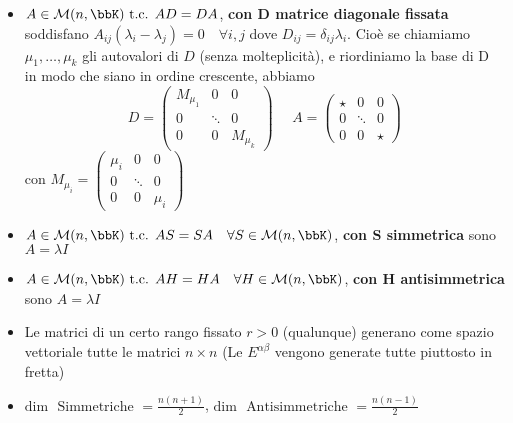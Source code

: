 \documentclass[a4paper,NoNotes]{stdmdoc}
\newcommand{\tc}{\mbox{ t.c. }}
\newcommand{\Dim}{\mbox{dim }}
\begin{document}
\begin{itemize}
		\item $A \in \mathcal{M}(n, \bbK) \tc AD = DA$, {\bf con $\bm D$ matrice diagonale fissata} soddisfano $A_{ij}(\lambda_i - \lambda_j) = 0 \quad \forall i,j$ dove $D_{ij} = \delta_{ij}\lambda_i$. Cioè se chiamiamo $\mu_1, \ldots, \mu_k$ gli autovalori di $D$ (senza molteplicità), e riordiniamo la base di D in modo che siano in ordine crescente, abbiamo $$D = \left(\begin{array}{c|c|c} M_{\mu_1} & 0 & 0 \\ \hline 0 & \ddots & 0 \\ \hline 0 & 0 & M_{\mu_k} \end{array}\right) \ \ \ \ \ \ A = \left(\begin{array}{c|c|c} \star & 0 & 0 \\ \hline 0 & \ddots & 0 \\ \hline 0 & 0 & \star \end{array}\right) $$ con $M_{\mu_i} = \left(\begin{array}{ccc} \mu_i & 0 & 0 \\ 0 & \ddots & 0 \\ 0 & 0 & \mu_i \end{array}\right)$
		\item $A \in \mathcal{M}(n, \bbK) \tc AS = SA \quad \forall S \in \mathcal{M}(n, \bbK)$, {\bf con $\bm S$ simmetrica} sono $A = \lambda I$
		\item $A \in \mathcal{M}(n, \bbK) \tc AH = HA \quad \forall H \in \mathcal{M}(n, \bbK)$, {\bf con $\bm H$ antisimmetrica} sono $A = \lambda I$
		\item Le matrici di un certo rango fissato $r > 0$ (qualunque) generano come spazio vettoriale tutte le matrici $n\times n$ (Le $E^{\alpha\beta}$ vengono generate tutte piuttosto in fretta)
		\item $\Dim \mbox{ Simmetriche } = \frac{n(n+1)}{2}$, $\Dim \mbox{ Antisimmetriche } = \frac{n(n-1)}{2}$
	\end{itemize}
	
\end{document}
